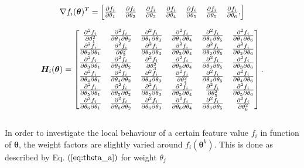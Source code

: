 \begin{equation}\label{eq:Grad}
\centering
\nabla f_i(\bm{\theta})^T = 
\begin{bmatrix}
\pdv{f_i}{\theta_1} & \pdv{f_i}{\theta_2} & \pdv{f_i}{\theta_3} & \pdv{f_i}{\theta_4} &\pdv{f_i}{\theta_5} & \pdv{f_i}{\theta_5} & \pdv{f_i}{\theta_6},
\end{bmatrix}
\end{equation}

\begin{equation}\label{eq:Hess}
\centering
\bm{H}_i(\bm{\theta}) = 
\begin{bmatrix}

 \pdv[2]{f_i}{\theta_1} & \pdv{f_i}{\theta_1}{\theta_2}& \pdv{f_i}{\theta_1}{\theta_3}& \pdv{f_i}{\theta_1}{\theta_4}& \pdv{f_i}{\theta_1}{\theta_5}& \pdv{f_i}{\theta_1}{\theta_6}\\
 
  \pdv{f_i}{\theta_2}{\theta_1}&\pdv[2]{f_i}{\theta_2} & \pdv{f_i}{\theta_2}{\theta_3}& \pdv{f_i}{\theta_2}{\theta_4}&\pdv{f_i}{\theta_2}{\theta_5}&\pdv{f_i}{\theta_2}{\theta_6}\\
  
  \pdv{f_i}{\theta_3}{\theta_1}&\pdv{f_i}{\theta_3}{\theta_2}&\pdv[2]{f_i}{\theta_3} &  \pdv{f_i}{\theta_3}{\theta_4}&\pdv{f_i}{\theta_3}{\theta_5}&\pdv{f_i}{\theta_3}{\theta_6}\\
  
  \pdv{f_i}{\theta_4}{\theta_1}&\pdv{f_i}{\theta_4}{\theta_2} &  \pdv{f_i}{\theta_4}{\theta_3}&\pdv[2]{f_i}{\theta_4}&\pdv{f_i}{\theta_4}{\theta_5}&\pdv{f_i}{\theta_4}{\theta_6}\\
  
  \pdv{f_i}{\theta_5}{\theta_1}&\pdv{f_i}{\theta_5}{\theta_2} &  \pdv{f_i}{\theta_5}{\theta_3}&\pdv{f_i}{\theta_5}{\theta_4}&\pdv[2]{f_i}{\theta_5}&\pdv{f_i}{\theta_5}{\theta_6}\\
  
  \pdv{f_i}{\theta_6}{\theta_1}&\pdv{f_i}{\theta_6}{\theta_2} &  \pdv{f_i}{\theta_6}{\theta_3}&\pdv{f_i}{\theta_6}{\theta_4}&\pdv{f_i}{\theta_6}{\theta_5}&\pdv[2]{f_i}{\theta_6}

\end{bmatrix}.
\end{equation}\\

In order to investigate the local behaviour of a certain feature value $f_i$ in function of $\bm{\theta}$, the weight factors are slightly varied around $f_i(\bm{\theta}^k)$. This is done as described by Eq. $(\ref{eq:theta_a})$ for weight $\theta_j$

